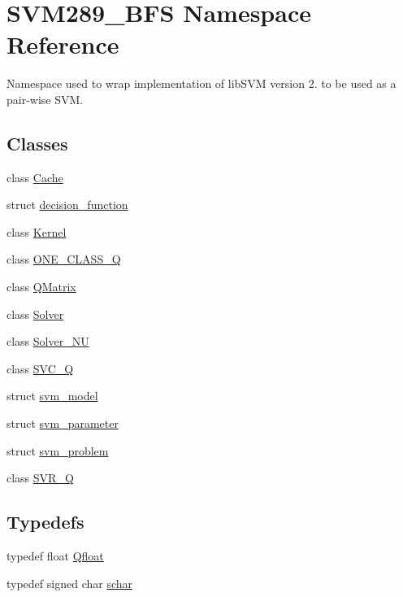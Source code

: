 \hypertarget{namespace_s_v_m289___b_f_s}{}\section{S\+V\+M289\+\_\+\+B\+FS Namespace Reference}
\label{namespace_s_v_m289___b_f_s}


Namespace used to wrap implementation of lib\+S\+VM version 2. to be used as a pair-\/wise S\+VM.  


\subsection*{Classes}
\begin{DoxyCompactItemize}
\item 
class \hyperlink{class_s_v_m289___b_f_s_1_1_cache}{Cache}
\item 
struct \hyperlink{struct_s_v_m289___b_f_s_1_1decision__function}{decision\+\_\+function}
\item 
class \hyperlink{class_s_v_m289___b_f_s_1_1_kernel}{Kernel}
\item 
class \hyperlink{class_s_v_m289___b_f_s_1_1_o_n_e___c_l_a_s_s___q}{O\+N\+E\+\_\+\+C\+L\+A\+S\+S\+\_\+Q}
\item 
class \hyperlink{class_s_v_m289___b_f_s_1_1_q_matrix}{Q\+Matrix}
\item 
class \hyperlink{class_s_v_m289___b_f_s_1_1_solver}{Solver}
\item 
class \hyperlink{class_s_v_m289___b_f_s_1_1_solver___n_u}{Solver\+\_\+\+NU}
\item 
class \hyperlink{class_s_v_m289___b_f_s_1_1_s_v_c___q}{S\+V\+C\+\_\+Q}
\item 
struct \hyperlink{struct_s_v_m289___b_f_s_1_1svm__model}{svm\+\_\+model}
\item 
struct \hyperlink{struct_s_v_m289___b_f_s_1_1svm__parameter}{svm\+\_\+parameter}
\item 
struct \hyperlink{struct_s_v_m289___b_f_s_1_1svm__problem}{svm\+\_\+problem}
\item 
class \hyperlink{class_s_v_m289___b_f_s_1_1_s_v_r___q}{S\+V\+R\+\_\+Q}
\end{DoxyCompactItemize}
\subsection*{Typedefs}
\begin{DoxyCompactItemize}
\item 
typedef float \hyperlink{namespace_s_v_m289___b_f_s_a8b0a7657dcefcb6e9a857c9b5e2fd2ef}{Qfloat}
\item 
typedef signed char \hyperlink{namespace_s_v_m289___b_f_s_a67b51ac46a91cdb7ad72dea9fad6c0f0}{schar}
\end{DoxyCompactItemize}
